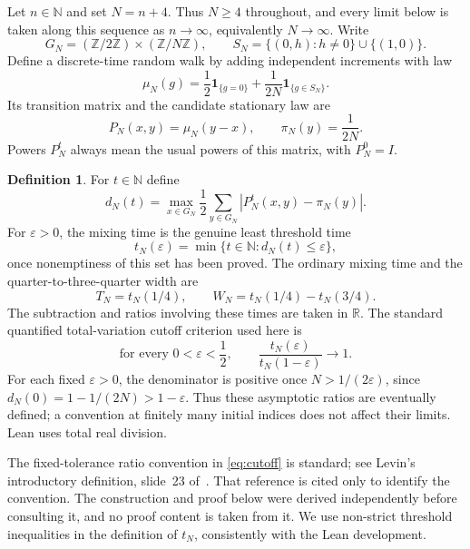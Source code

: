 \documentclass[11pt,a4paper]{article}
\theoremstyle{definition}
\newtheorem{definition}[theorem]{Definition}
\theoremstyle{remark}
\newcommand{\R}{\mathbb R}
\newcommand{\N}{\mathbb N}
\newcommand{\Z}{\mathbb Z}
\newcommand{\ind}{\mathbf 1}
\begin{document}
Let $n\in\N$ and set $N=n+4$. Thus $N\ge4$ throughout, and every limit below
is taken along this sequence as $n\to\infty$, equivalently $N\to\infty$.
Write
\[
G_N=(\Z/2\Z)\times(\Z/N\Z),\qquad
S_N=\{(0,h):h\ne0\}\cup\{(1,0)\}.
\]
Define a discrete-time random walk by adding independent increments with law
\begin{equation}\label{eq:jump}
\mu_N(g)=\frac12\ind_{\{g=0\}}
        +\frac1{2N}\ind_{\{g\in S_N\}}.
\end{equation}
Its transition matrix and the candidate stationary law are
\begin{equation}\label{eq:kernel}
P_N(x,y)=\mu_N(y-x),\qquad \pi_N(y)=\frac1{2N}.
\end{equation}
Powers $P_N^t$ always mean the usual powers of this matrix, with $P_N^0=I$.

\begin{definition}\label{def:mixing}
For $t\in\N$ define
\[
d_N(t)=\max_{x\in G_N}\frac12\sum_{y\in G_N}
          \left|P_N^t(x,y)-\pi_N(y)\right|.
\]
For $\varepsilon>0$, the mixing time is the genuine least threshold time
\[
t_N(\varepsilon)=\min\{t\in\N:d_N(t)\le\varepsilon\},
\]
once nonemptiness of this set has been proved. The ordinary mixing time and
the quarter-to-three-quarter width are
\[
T_N=t_N(1/4),\qquad W_N=t_N(1/4)-t_N(3/4).
\]
The subtraction and ratios involving these times are taken in $\R$.
The standard quantified total-variation cutoff criterion used here is
\begin{equation}\label{eq:cutoff}
\text{for every }0<\varepsilon<\frac12,\qquad
\frac{t_N(\varepsilon)}{t_N(1-\varepsilon)}\longrightarrow1.
\end{equation}
For each fixed $\varepsilon>0$, the denominator is positive once
$N>1/(2\varepsilon)$, since $d_N(0)=1-1/(2N)>1-\varepsilon$.
Thus these asymptotic ratios are eventually defined; a convention at finitely
many initial indices does not affect their limits. Lean uses total real division.
\end{definition}

The fixed-tolerance ratio convention in \eqref{eq:cutoff} is standard; see
Levin's introductory definition, slide~23 of~\cite{levin}. That reference is
cited only to identify the convention. The construction and proof below
were derived independently before consulting it, and no proof content is
taken from it. We use non-strict threshold inequalities in the definition
of $t_N$, consistently with the Lean development.
\end{document}
